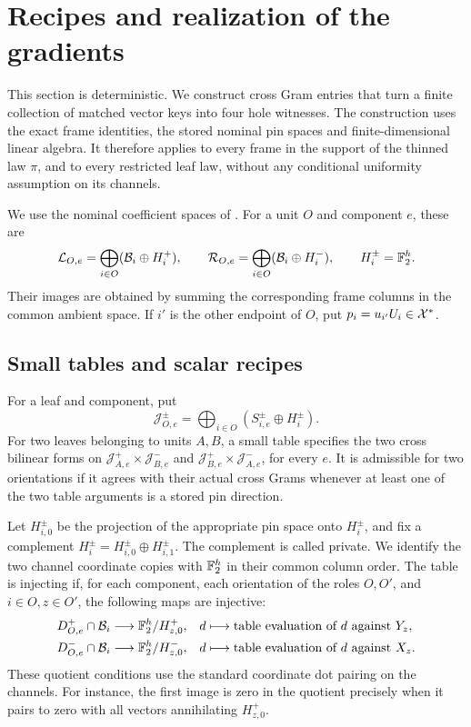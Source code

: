 \section{Recipes and realization of the gradients}\label{sec:realization}

This section is deterministic.  We construct cross Gram entries
that turn a finite collection of matched vector keys into four
hole witnesses.  The construction uses the exact frame identities,
the stored nominal pin spaces and finite-dimensional linear
algebra.  It therefore applies to every frame in the support of
the thinned law $\pi$, and to every restricted leaf law, without
any conditional uniformity assumption on its channels.

We use the nominal coefficient spaces of .
For a unit $O$ and component $e$, these are
\[
 \mathcal L_{O,e}=\bigoplus_{i\in O}(\mathcal B_i\oplus H_i^+),\qquad
 \mathcal R_{O,e}=\bigoplus_{i\in O}(\mathcal B_i\oplus H_i^-),
 \qquad H_i^\pm=\mathbb F_2^h.
\]
Their images are obtained by summing the corresponding frame
columns in the common ambient space.  If $i'$ is the other
endpoint of $O$, put $p_i=u_{i'}U_i\in\mathcal X^*$.

\subsection{Small tables and scalar recipes}

\begin{definition}\label{def:small-table}
For a leaf and component, put
\[
 \mathcal J_{O,e}^{\pm}
 =\bigoplus_{i\in O}(S_{i,e}^{\pm}\oplus H_i^{\pm}).
\]
For two leaves belonging to units $A,B$, a small table specifies
the two cross bilinear forms on
$\mathcal J_{A,e}^+\times\mathcal J_{B,e}^-$ and
$\mathcal J_{B,e}^+\times\mathcal J_{A,e}^-$, for every $e$.
It is admissible for two orientations if it agrees with their
actual cross Grams whenever at least one of the two table
arguments is a stored pin direction.

Let $H_{i,0}^{\pm}$ be the projection of the appropriate pin
space onto $H_i^{\pm}$, and fix a complement
$H_i^{\pm}=H_{i,0}^{\pm}\oplus H_{i,1}^{\pm}$.
The complement is called private.  We identify the two channel
coordinate copies with $\mathbb F_2^h$ in their common column order.
The table is injecting if, for each component, each orientation
of the roles $O,O'$, and $i\in O,z\in O'$, the following maps
are injective:
\begin{align}\label{eq:table-injection}
 D_{O,e}^+\cap\mathcal B_i&\longrightarrow\mathbb F_2^h/H_{z,0}^+,
 &d&\longmapsto\text{table evaluation of $d$ against $Y_z$},\\
 D_{O,e}^-\cap\mathcal B_i&\longrightarrow\mathbb F_2^h/H_{z,0}^-,
 &d&\longmapsto\text{table evaluation of $d$ against $X_z$}.
 \notag
\end{align}
These quotient conditions use the standard coordinate dot
pairing on the channels.  For instance, the first image is
zero in the quotient precisely when it pairs to zero with
all vectors annihilating $H_{z,0}^+$.
\end{definition}

